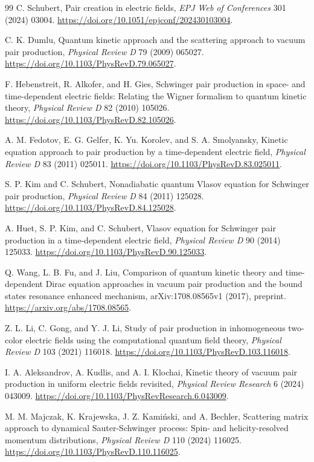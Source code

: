 \documentclass[11pt,a4paper]{article}
\begin{document}
\begin{thebibliography}{99}
C. Schubert, Pair creation in electric fields, \textit{EPJ Web of Conferences} 301 (2024) 03004. \url{https://doi.org/10.1051/epjconf/202430103004}.

C. K. Dumlu, Quantum kinetic approach and the scattering approach to vacuum pair production, \textit{Physical Review D} 79 (2009) 065027. \url{https://doi.org/10.1103/PhysRevD.79.065027}.

F. Hebenstreit, R. Alkofer, and H. Gies, Schwinger pair production in space- and time-dependent electric fields: Relating the Wigner formalism to quantum kinetic theory, \textit{Physical Review D} 82 (2010) 105026. \url{https://doi.org/10.1103/PhysRevD.82.105026}.

A. M. Fedotov, E. G. Gelfer, K. Yu. Korolev, and S. A. Smolyansky, Kinetic equation approach to pair production by a time-dependent electric field, \textit{Physical Review D} 83 (2011) 025011. \url{https://doi.org/10.1103/PhysRevD.83.025011}.

S. P. Kim and C. Schubert, Nonadiabatic quantum Vlasov equation for Schwinger pair production, \textit{Physical Review D} 84 (2011) 125028. \url{https://doi.org/10.1103/PhysRevD.84.125028}.

A. Huet, S. P. Kim, and C. Schubert, Vlasov equation for Schwinger pair production in a time-dependent electric field, \textit{Physical Review D} 90 (2014) 125033. \url{https://doi.org/10.1103/PhysRevD.90.125033}.

Q. Wang, L. B. Fu, and J. Liu, Comparison of quantum kinetic theory and time-dependent Dirac equation approaches in vacuum pair production and the bound states resonance enhanced mechanism, arXiv:1708.08565v1 (2017), preprint. \url{https://arxiv.org/abs/1708.08565}.

Z. L. Li, C. Gong, and Y. J. Li, Study of pair production in inhomogeneous two-color electric fields using the computational quantum field theory, \textit{Physical Review D} 103 (2021) 116018. \url{https://doi.org/10.1103/PhysRevD.103.116018}.

I. A. Aleksandrov, A. Kudlis, and A. I. Klochai, Kinetic theory of vacuum pair production in uniform electric fields revisited, \textit{Physical Review Research} 6 (2024) 043009. \url{https://doi.org/10.1103/PhysRevResearch.6.043009}.

M. M. Majczak, K. Krajewska, J. Z. Kami\'nski, and A. Bechler, Scattering matrix approach to dynamical Sauter-Schwinger process: Spin- and helicity-resolved momentum distributions, \textit{Physical Review D} 110 (2024) 116025. \url{https://doi.org/10.1103/PhysRevD.110.116025}.


\end{thebibliography}
\end{document}
